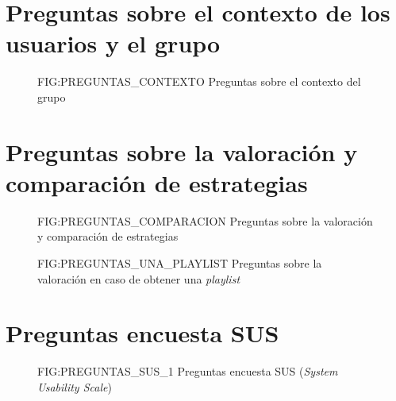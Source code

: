 \section{Preguntas sobre el contexto de los usuarios y el grupo\label{SEC:PREGUNTAS_CONTEXTO}}

\begin{figure}[Preguntas sobre el contexto del grupo]{FIG:PREGUNTAS_CONTEXTO}
    {Preguntas sobre el contexto del grupo}
\end{figure}

\newpage

\section{Preguntas sobre la valoración y comparación de estrategias\label{SEC:PREGUNTAS_COMPARACION}}

\begin{figure}[Preguntas sobre la valoración y comparación de estrategias]{FIG:PREGUNTAS_COMPARACION}
    {Preguntas sobre la valoración y comparación de estrategias}
    
\end{figure}

\begin{figure}[Preguntas sobre la valoración en caso de obtener una \textit{playlist}]{FIG:PREGUNTAS_UNA_PLAYLIST}
    {Preguntas sobre la valoración en caso de obtener una \textit{playlist}}
    
\end{figure}

\newpage
\newpage

\section{Preguntas encuesta SUS\label{SEC:PREGUNTAS_SUS}}


\begin{figure}[Preguntas encuesta SUS (\textit{System Usability Scale}) Parte 1]{FIG:PREGUNTAS_SUS_1}
    {Preguntas encuesta SUS (\textit{System Usability Scale})}
\end{figure}

